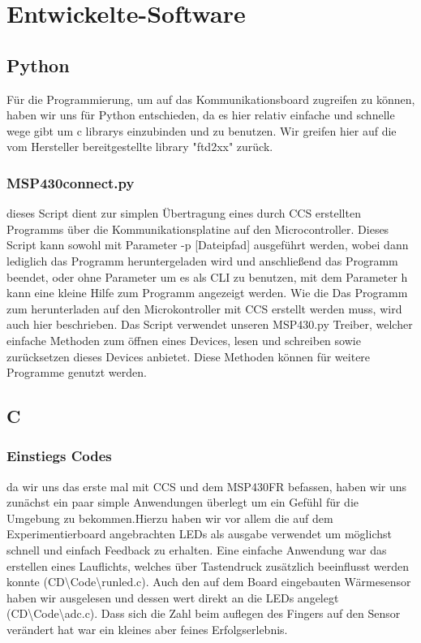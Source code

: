 %
\chapter{Entwickelte-Software}
\label{chap:Anwendung}

\section{Python}
Für die Programmierung, um auf das Kommunikationsboard zugreifen zu können, haben wir uns für Python entschieden, da es hier relativ einfache und schnelle wege gibt um c librarys einzubinden und zu benutzen.  Wir greifen hier auf die vom Hersteller bereitgestellte library "ftd2xx" zurück.

\subsection{MSP430connect.py}
dieses Script dient zur simplen Übertragung eines durch CCS erstellten Programms über die Kommunikationsplatine auf den Microcontroller. Dieses Script kann sowohl mit Parameter -p [Dateipfad] ausgeführt werden, wobei dann lediglich das Programm heruntergeladen wird und anschließend das Programm beendet, oder ohne Parameter um es als CLI zu benutzen, mit dem Parameter h kann eine kleine Hilfe zum Programm angezeigt werden. Wie die Das Programm zum herunterladen auf den Microkontroller mit CCS erstellt werden muss, wird auch hier beschrieben.
Das Script verwendet unseren MSP430.py Treiber, welcher einfache Methoden zum öffnen eines Devices, lesen und schreiben sowie zurücksetzen dieses Devices anbietet. Diese Methoden können für weitere Programme genutzt werden.

\section{C}

\subsection{Einstiegs Codes}
da wir uns das erste mal mit CCS und dem MSP430FR befassen, haben wir uns zunächst ein paar simple Anwendungen überlegt um ein Gefühl für die Umgebung zu bekommen.Hierzu haben wir vor allem die auf dem Experimentierboard angebrachten LEDs als ausgabe verwendet um möglichst schnell und einfach Feedback zu erhalten. Eine einfache Anwendung war das erstellen eines Lauflichts, welches über Tastendruck zusätzlich beeinflusst werden konnte \tiny(CD\textbackslash Code\textbackslash runled.c)\normalsize. Auch den auf dem Board eingebauten Wärmesensor haben wir ausgelesen und dessen wert direkt an die LEDs angelegt \tiny(CD\textbackslash Code\textbackslash adc.c)\normalsize. Dass sich die Zahl beim auflegen des Fingers auf den Sensor verändert hat war ein kleines aber feines Erfolgserlebnis.

